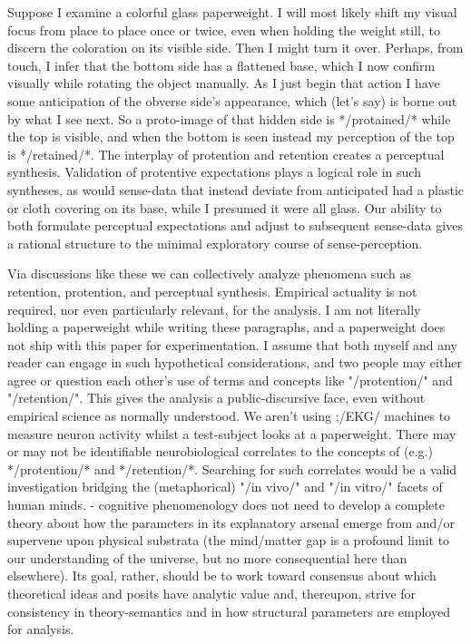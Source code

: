 Suppose I examine a colorful glass paperweight.  I will most likely shift my 
visual focus from place to place once or twice, even when holding the 
weight still, to discern the coloration on its visible 
side.  Then I might turn it over.  Perhaps, from touch, I infer that 
the bottom side has a flattened base, which I now confirm visually 
while rotating the object manually.  As I just begin that action I 
have some anticipation of the obverse side's appearance, which (let's 
say) is borne out by what I see next.  So a proto-image of that 
hidden side is */protained/* while the top is visible, and when the 
bottom is seen instead my perception of the top is */retained/*. 
The interplay of protention and retention creates a 
perceptual synthesis.  Validation of protentive expectations 
plays a logical role in such syntheses, as would sense-data 
that instead deviate from anticipated %
had a plastic or cloth covering on its base, while I 
presumed it were all glass.  Our ability to both formulate 
perceptual expectations and adjust to subsequent sense-data 
gives a rational structure to the minimal exploratory 
course of sense-perception.

Via discussions like these we can collectively analyze 
phenomena such as retention, protention, and perceptual 
synthesis.  Empirical actuality 
is not required, nor even particularly relevant, for the 
analysis.  I am not literally holding a paperweight while 
writing these paragraphs, and a paperweight does not 
ship with this paper for experimentation.  I assume that 
both myself and any reader can engage in such hypothetical 
considerations, and two people may either agree or question 
each other's use of terms and concepts like 
"/protention/" and "/retention/".  This gives the analysis 
a public-discursive face, even without empirical 
science as normally understood.  We aren't using 
;/EKG/ machines to measure neuron activity 
whilst a test-subject looks at a paperweight.  There may or 
may not be identifiable neurobiological correlates to the 
concepts of (e.g.) */protention/* and */retention/*.  
Searching for such correlates would be a valid investigation 
bridging the (metaphorical) "/in vivo/" and "/in vitro/" 
facets of human minds.  -%
cognitive phenomenology does not need to develop a 
complete theory about how the parameters in its 
explanatory arsenal emerge from and/or supervene upon physical substrata 
(the mind/matter gap is a profound limit to our 
understanding of the universe, but no more consequential 
here than elsewhere).  
Its goal, rather, should be to work toward 
consensus about which theoretical ideas and 
posits have analytic value and, thereupon, strive for consistency 
in theory-semantics and in how structural parameters are 
employed for analysis.    
     

